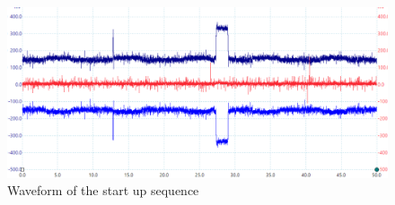  \begin{figure}[H]
\centering
\includegraphics[width=16 cm]{Project_Report/Images/startup_intial.PNG}
\caption{Waveform of the start up sequence}
\label{fig:startup_intial}
\end{figure}


